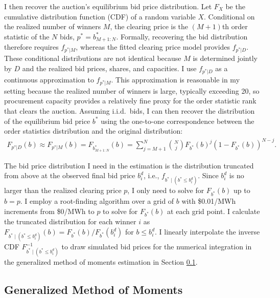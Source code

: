 \documentclass[12pt]{article}
\theoremstyle{definition} %
\begin{document}
I then recover the auction's equilibrium bid price distribution. Let $F_X$ be the cumulative distribution function (CDF) of a random variable $X$. Conditional on the realized number of winners $M$, the clearing price is the $(M+1)$th order statistic of the $N$ bids, $p^\ast=b^\ast_{M+1:N}$. Formally, recovering the bid distribution therefore requires $f_{p^\ast|M}$, whereas the fitted clearing price model provides $f_{p^\ast|D}$. These conditional distributions are not identical because $M$ is determined jointly by $D$ and the realized bid prices, shares, and capacities. I use $f_{p^\ast|D}$ as a continuous approximation to $f_{p^\ast|M}$. This approximation is reasonable in my setting because the realized number of winners is large, typically exceeding 20, so procurement capacity provides a relatively fine proxy for the order statistic rank that clears the auction. Assuming i.i.d.\ bids, I can then recover the distribution of the equilibrium bid price $b^\ast$ using the one-to-one correspondence between the order statistics distribution and the original distribution:
\begin{align*}
F_{p^\ast|D}(b) \approx F_{p^\ast|M}(b) = F_{b^\ast_{M+1:N}}(b) = \sum_{j=M+1}^N \binom{N}{j} F_{b^\ast}(b)^j (1-F_{b^\ast}(b))^{N-j}.
\end{align*}

The bid price distribution I need in the estimation is the distribution truncated from above at the observed final bid price $b_i^d$, i.e., $f_{b^\ast \mid (b^\ast \leq b_i^d)}$. Since $b_i^d$ is no larger than the realized clearing price $p$, I only need to solve for $F_{b^\ast}(b)$ up to $b = p$. I employ a root-finding algorithm over a grid of $b$ with \$0.01/MWh increments from \$0/MWh to $p$ to solve for $F_{b^\ast}(b)$ at each grid point. I calculate the truncated distribution for each winner $i$ as $F_{b^\ast \mid (b^\ast \leq b_i^d)}(b) = F_{b^\ast}(b)/F_{b^\ast}(b_i^d)$ for $b \leq b_i^d$. I linearly interpolate the inverse CDF $F_{b^\ast \mid (b^\ast \leq b_i^d)}^{-1}$ to draw simulated bid prices for the numerical integration in the generalized method of moments estimation in Section \ref{sec:gmm}.


\subsection{Generalized Method of Moments}
\label{sec:gmm}
\end{document}
